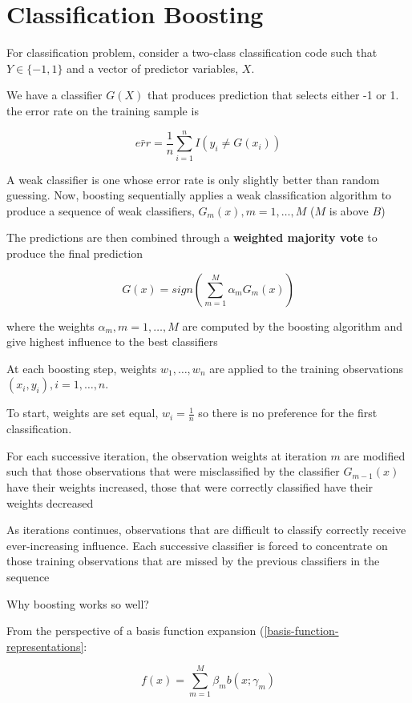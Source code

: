 \documentclass[
]{book}
\begin{document}
\hypertarget{classification-boosting}{%
\section{Classification Boosting}\label{classification-boosting}}

For classification problem, consider a two-class classification code such that \(Y \in \{ -1, 1\}\) and a vector of predictor variables, \(X\).

We have a classifier \(G(X)\) that produces prediction that selects either -1 or 1. the error rate on the training sample is

\[
\bar{err} = \frac{1}{n} \sum_{i=1}^n I(y_i \neq G(x_i))
\]

A weak classifier is one whose error rate is only slightly better than random guessing. Now, boosting sequentially applies a weak classification algorithm to produce a sequence of weak classifiers, \(G_m(x), m = 1, \dots, M\) (\(M\) is above \(B\))

The predictions are then combined through a \textbf{weighted majority vote} to produce the final prediction

\[
G(x) = sign (\sum_{m=1}^M \alpha_m G_m (x))
\]

where the weights \(\alpha_m, m = 1, \dots, M\) are computed by the boosting algorithm and give highest influence to the best classifiers

At each boosting step, weights \(w_1, \dots, w_n\) are applied to the training observations \((x_i, y_i), i = 1, \dots, n\).

To start, weights are set equal, \(w_i = \frac{1}{n}\) so there is no preference for the first classification.

For each successive iteration, the observation weights at iteration \(m\) are modified such that those observations that were misclassified by the classifier \(G_{m-1}(x)\) have their weights increased, those that were correctly classified have their weights decreased

As iterations continues, observations that are difficult to classify correctly receive ever-increasing influence. Each successive classifier is forced to concentrate on those training observations that are missed by the previous classifiers in the sequence

Why boosting works so well?

From the perspective of a basis function expansion (\ref{basis-function-representations}:

\[
f(x) = \sum_{m=1}^M \beta_m b(x; \gamma_m)
\]
\end{document}

